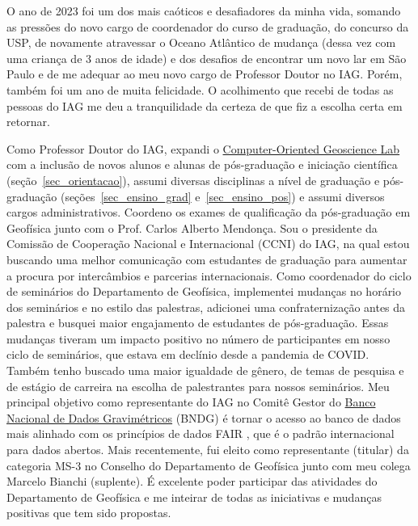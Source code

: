 \documentclass[12pt,a4paper,oneside]{book}
\newcommand{\CompGeoLabLink}{\href{https://www.compgeolab.org/}{Computer-Oriented Geoscience Lab}}
\begin{document}
O ano de 2023 foi um dos mais caóticos e desafiadores da minha vida, somando as
pressões do novo cargo de coordenador do curso de graduação, do concurso da USP,
de novamente atravessar o Oceano Atlântico de mudança (dessa vez com uma
criança de 3 anos de idade) e dos desafios de encontrar um novo lar em São
Paulo e de me adequar ao meu novo cargo de Professor Doutor no IAG. Porém,
também foi um ano de muita felicidade. O acolhimento que recebi de todas as
pessoas do IAG me deu a tranquilidade da certeza de que fiz a escolha certa em
retornar.

Como Professor Doutor do IAG, expandi o \CompGeoLabLink{} com a inclusão de
novos alunos e alunas de pós-graduação e iniciação científica
(seção~\ref{sec_orientacao}), assumi diversas disciplinas a nível de
graduação e pós-graduação (seções~\ref{sec_ensino_grad}
e~\ref{sec_ensino_pos}) e assumi diversos cargos administrativos.
Coordeno os exames de qualificação da pós-graduação em Geofísica junto com
o Prof. Carlos Alberto Mendonça.
Sou o presidente da Comissão de Cooperação Nacional e Internacional (CCNI) do
IAG, na qual estou buscando uma melhor comunicação com estudantes de graduação
para aumentar a procura por intercâmbios e parcerias internacionais.
Como coordenador do ciclo de seminários do Departamento de Geofísica,
implementei mudanças no horário dos seminários e no estilo das palestras,
adicionei uma confraternização antes da palestra e busquei maior engajamento de
estudantes de pós-graduação. Essas mudanças tiveram um impacto positivo no
número de participantes em nosso ciclo de seminários, que estava em declínio
desde a pandemia de COVID.
Também tenho buscado uma maior igualdade de gênero, de temas de pesquisa e de
estágio de carreira na escolha de palestrantes para nossos seminários.
Meu principal objetivo como representante do IAG no Comitê Gestor do
\href{https://www.gov.br/anp/pt-br/assuntos/exploracao-e-producao-de-oleo-e-gas/dados-tecnicos/legislacao-aplicavel/bndg-banco-nacional-de-dados-gravimetricos}{Banco Nacional de Dados Gravimétricos} (BNDG)
é tornar o acesso ao banco de dados mais alinhado com os princípios de dados
FAIR \citep{Wilkinson2016}, que é o padrão internacional para dados abertos.
Mais recentemente, fui eleito como representante (titular) da categoria MS-3 no
Conselho do Departamento de Geofísica junto com meu colega Marcelo Bianchi
(suplente).
É excelente poder participar das atividades do Departamento de Geofísica e me
inteirar de todas as iniciativas e mudanças positivas que tem sido
propostas.
\end{document}
